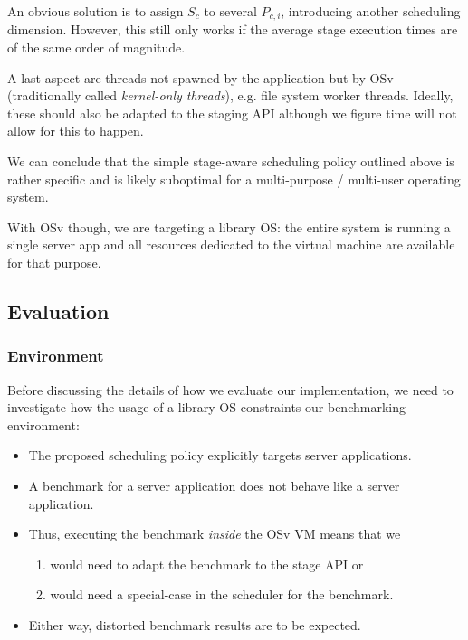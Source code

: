 \documentclass{article}
\begin{document}
An obvious solution is to assign $S_c$ to several $P_{c,i}$, introducing another scheduling dimension.
However, this still only works if the average stage execution times are of the same order of magnitude.

A last aspect are threads not spawned by the application but by OSv (traditionally called \emph{kernel-only threads}),
e.g. file system worker threads.
Ideally, these should also be adapted to the staging API although we figure time will not allow for this to happen.

We can conclude that the simple stage-aware scheduling policy outlined above is rather specific and
is likely suboptimal for a multi-purpose / multi-user operating system.

With OSv though, we are targeting a library OS:
the entire system is running a single server app and all resources dedicated to the virtual machine are available for that purpose.

\subsection{Evaluation}\label{evaluation}

\subsubsection{Environment}\label{environment}
Before discussing the details of how we evaluate our implementation,
we need to investigate how the usage of a library OS constraints our benchmarking environment:

\begin{itemize}
    \item The proposed scheduling policy explicitly targets server applications.
    \item A benchmark for a server application does not behave like a server application.
    \item Thus, executing the benchmark \emph{inside} the OSv VM means that we
    \begin{enumerate}
        \item would need to adapt the benchmark to the stage API or
        \item would need a special-case in the scheduler for the benchmark.
    \end{enumerate}
    \item Either way, distorted benchmark results are to be expected.
\end{itemize}
\end{document}
